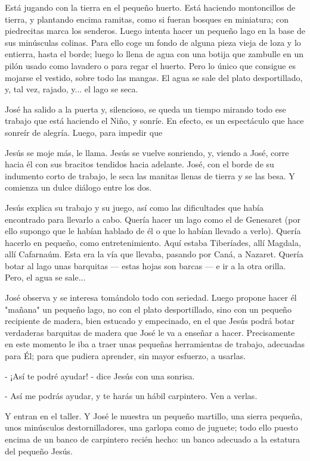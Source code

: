 \documentclass[12pt]{book} %
\begin{document}
Está jugando con la tierra en el pequeño huerto. Está haciendo montoncillos de tierra, y plantando encima ramitas, como si fueran bosques en miniatura; con piedrecitas marca los senderos. Luego intenta hacer un pequeño lago en la base de sus minúsculas colinas. Para ello coge un fondo de alguna pieza vieja de loza y lo entierra, hasta el borde; luego lo llena de agua con una botija que zambulle en un pilón usado como lavadero o para regar el huerto. Pero lo único que consigue es mojarse el vestido, sobre todo las mangas. El agua se sale del plato desportillado, y, tal vez, rajado, y... el lago se seca. 

José ha salido a la puerta y, silencioso, se queda un tiempo mirando todo ese trabajo que está haciendo el Niño, y sonríe. En efecto, es un espectáculo que hace sonreír de alegría. Luego, para impedir que 

Jesús se moje más, le llama. Jesús se vuelve sonriendo, y, viendo a José, corre hacia él con sus bracitos tendidos hacia adelante. José, con el borde de su indumento corto de trabajo, le seca las manitas llenas de tierra y se las besa. Y comienza un dulce diálogo entre los dos. 

Jesús explica su trabajo y su juego, así como las dificultades que había encontrado para llevarlo a cabo. Quería hacer un lago como el de Genesaret (por ello supongo que le habían hablado de él o que lo habían llevado a verlo). Quería hacerlo en pequeño, como entretenimiento. Aquí estaba Tiberíades, allí Magdala, allí Cafarnaúm. Esta era la vía que llevaba, pasando por Caná, a Nazaret. Quería botar al lago unas barquitas — estas hojas son barcas — e ir a la otra orilla. Pero, el agua se sale... 

José observa y se interesa tomándolo todo con seriedad. Luego propone hacer él "mañana" un pequeño lago, no con el plato desportillado, sino con un pequeño recipiente de madera, bien estucado y empecinado, en el que Jesús podrá botar verdaderas barquitas de madera que José le va a enseñar a hacer. Precisamente en este momento le iba a traer unas pequeñas herramientas de trabajo, adecuadas para Él; para que pudiera aprender, sin mayor esfuerzo, a usarlas. 

- ¡Así te podré ayudar! - dice Jesús con una sonrisa. 

- Así me podrás ayudar, y te harás un hábil carpintero. Ven a verlas. 

Y entran en el taller. Y José le muestra un pequeño martillo, una sierra pequeña, unos minúsculos destornilladores, una garlopa como de juguete; todo ello puesto encima de un banco de carpintero recién hecho: un banco adecuado a la estatura del pequeño Jesús. 
\end{document}
